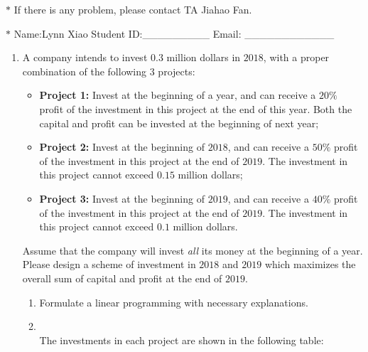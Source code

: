 \documentclass[12pt,a4paper]{article}
\makeatletter
\newtheorem*{solution}{Solution}
\theoremstyle{definition}
\renewenvironment{solution}[1][Solution] {\par\pushQED{\qed}\normalfont\topsep6\p@\@plus6\p@\relax\trivlist\item[\hskip\labelsep\bfseries#1\@addpunct{.}]\ignorespaces}{\popQED\endtrivlist\@endpefalse} \makeatother
\makeatother
\begin{document}
\noindent

\noindent{}
\begin{center}
\footnotesize{\color{red}$*$ If there is any problem, please contact TA Jiahao Fan.}

\footnotesize{\color{blue}$*$ Name:Lynn Xiao \quad Student ID:\_\_\_\_\_\_\_\_\_ \quad Email: \_\_\_\_\_\_\_\_\_\_\_\_}
\end{center}

\begin{enumerate}
    \item
    A company intends to invest $0.3$ million dollars in $2018$, with a proper combination of the following $3$ projects:
    \begin{itemize}
    \item \textbf{Project 1:} Invest at the beginning of a year, and can receive a $20\%$ profit of the investment in this project at the end of this year. Both the capital and profit can be invested at the beginning of next year;
    \item \textbf{Project 2:} Invest at the beginning of $2018$, and can receive a $50\%$ profit of the investment in this project at the end of $2019$. The investment in this project cannot exceed $0.15$ million dollars;
    \item \textbf{Project 3:} Invest at the beginning of $2019$, and can receive a $40\%$ profit of the investment in this project at the end of $2019$. The investment in this project cannot exceed $0.1$ million dollars.
    \end{itemize}
    Assume that the company will invest \emph{all} its money at the beginning of a year. Please design a scheme of investment in $2018$ and $2019$ which maximizes the overall sum of capital and profit at the end of $2019$.
    \begin{enumerate}
    \item
    Formulate a linear programming with necessary explanations.
	\begin{solution}
		~\\
		The investments in each project are shown in the following table:
		\begin{center}
			~\\
			

\end{center}
\end{solution}
\end{enumerate}
\end{enumerate}
\end{document}
